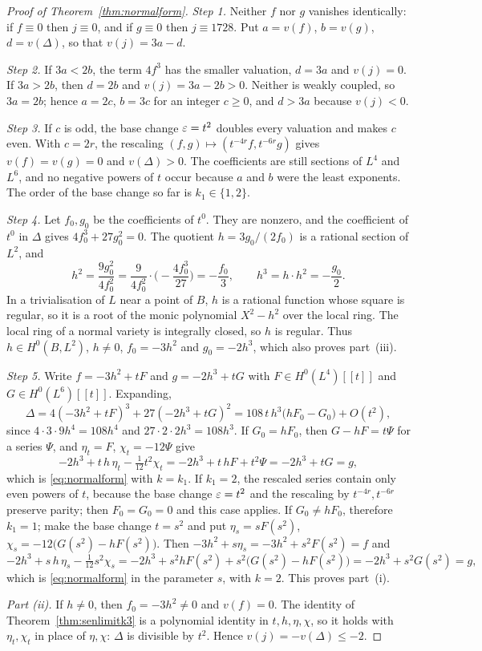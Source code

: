 \begin{proof}[Proof of Theorem~\ref{thm:normalform}]
\emph{Step 1.} Neither $f$ nor $g$ vanishes identically: if $f\equiv0$ then $j\equiv0$, and if $g\equiv0$ then $j\equiv1728$. Put $a=v(f)$, $b=v(g)$, $d=v(\Delta)$, so that $v(j)=3a-d$.

\emph{Step 2.} If $3a<2b$, the term $4f^3$ has the smaller valuation, $d=3a$ and $v(j)=0$. If $3a>2b$, then $d=2b$ and $v(j)=3a-2b>0$. Neither is weakly coupled, so $3a=2b$; hence $a=2c$, $b=3c$ for an integer $c\ge0$, and $d>3a$ because $v(j)<0$.

\emph{Step 3.} If $c$ is odd, the base change $\varepsilon=t^2$ doubles every valuation and makes $c$ even. With $c=2r$, the rescaling $(f,g)\mapsto(t^{-4r}f,t^{-6r}g)$ gives $v(f)=v(g)=0$ and $v(\Delta)>0$. The coefficients are still sections of $L^4$ and $L^6$, and no negative powers of $t$ occur because $a$ and $b$ were the least exponents. The order of the base change so far is $k_1\in\{1,2\}$.

\emph{Step 4.} Let $f_0,g_0$ be the coefficients of $t^0$. They are nonzero, and the coefficient of $t^0$ in $\Delta$ gives $4f_0^3+27g_0^2=0$. The quotient $h=3g_0/(2f_0)$ is a rational section of $L^2$, and
\[
h^2=\frac{9g_0^2}{4f_0^2}=\frac{9}{4f_0^2}\cdot\Big(-\frac{4f_0^3}{27}\Big)=-\frac{f_0}{3},\qquad h^3=h\cdot h^2=-\frac{g_0}{2}.
\]
In a trivialisation of $L$ near a point of $B$, $h$ is a rational function whose square is regular, so it is a root of the monic polynomial $X^2-h^2$ over the local ring. The local ring of a normal variety is integrally closed, so $h$ is regular. Thus $h\in H^0(B,L^2)$, $h\ne0$, $f_0=-3h^2$ and $g_0=-2h^3$, which also proves part~(iii).

\emph{Step 5.} Write $f=-3h^2+tF$ and $g=-2h^3+tG$ with $F\in H^0(L^4)[[t]]$ and $G\in H^0(L^6)[[t]]$. Expanding,
\[
\Delta=4(-3h^2+tF)^3+27(-2h^3+tG)^2=108\,t\,h^3\big(hF_0-G_0\big)+O(t^2),
\]
since $4\cdot3\cdot9h^4=108h^4$ and $27\cdot2\cdot2h^3=108h^3$. If $G_0=hF_0$, then $G-hF=t\Psi$ for a series $\Psi$, and $\eta_t=F$, $\chi_t=-12\Psi$ give
\[
-2h^3+t\,h\,\eta_t-\tfrac1{12}t^2\chi_t=-2h^3+t\,hF+t^2\Psi=-2h^3+tG=g,
\]
which is \eqref{eq:normalform} with $k=k_1$. If $k_1=2$, the rescaled series contain only even powers of $t$, because the base change $\varepsilon=t^2$ and the rescaling by $t^{-4r},t^{-6r}$ preserve parity; then $F_0=G_0=0$ and this case applies. If $G_0\ne hF_0$, therefore $k_1=1$; make the base change $t=s^2$ and put $\eta_s=sF(s^2)$, $\chi_s=-12\big(G(s^2)-hF(s^2)\big)$. Then $-3h^2+s\eta_s=-3h^2+s^2F(s^2)=f$ and
\[
-2h^3+s\,h\,\eta_s-\tfrac1{12}s^2\chi_s=-2h^3+s^2hF(s^2)+s^2\big(G(s^2)-hF(s^2)\big)=-2h^3+s^2G(s^2)=g,
\]
which is \eqref{eq:normalform} in the parameter $s$, with $k=2$. This proves part~(i).

\emph{Part (ii).} If $h\ne0$, then $f_0=-3h^2\ne0$ and $v(f)=0$. The identity of Theorem~\ref{thm:senlimitk3} is a polynomial identity in $t,h,\eta,\chi$, so it holds with $\eta_t,\chi_t$ in place of $\eta,\chi$: $\Delta$ is divisible by $t^2$. Hence $v(j)=-v(\Delta)\le-2$.
\end{proof}

